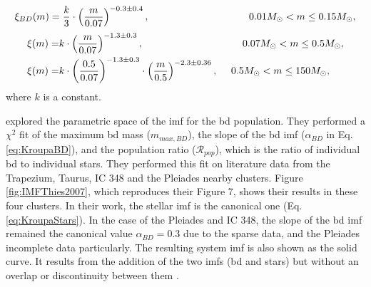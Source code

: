 \begin{equation}
\label{eq:KroupaBD}
\xi_{BD}(m)=\frac{k}{3}\cdot\left(\frac{m}{0.07}\right)^{-0.3\pm0.4}, \hspace{3.5cm} 0.01M_{\odot} < m \leq 0.15 M_{\odot},
\end{equation}
\begin{align}
\label{eq:KroupaStars}
\xi(m)=& k\cdot \left(\frac{m}{0.07}\right)^{-1.3\pm0.3}, \hspace{3.5cm} 0.07M_{\odot} < m \leq 0.5 M_{\odot},\nonumber\\
\xi(m)=& k\cdot \left(\frac{0.5}{0.07}\right)^{-1.3\pm0.3}\cdot  \left(\frac{m}{0.5}\right)^{-2.3\pm0.36}, \ \ \ \ 0.5 M_{\odot} < m \leq 150 M_{\odot},
\end{align}
where $k$ is a constant.
 
 \citet{Thies2007} explored the parametric space of the  \gls{imf} for the \gls{bd} population. They performed a $\chi^2$ fit of the maximum \gls{bd} mass ($m_{max,BD}$), the slope of the \gls{bd} \gls{imf} ($\alpha_{BD}$ in Eq. \ref{eq:KroupaBD}), and the population ratio ($\mathcal{R}_{pop}$), which is the ratio of individual \gls{bd} to individual stars. They performed this fit on literature data from the Trapezium, Taurus, IC 348 and the Pleiades nearby clusters. Figure \ref{fig:IMFThies2007}, which reproduces their Figure 7, shows their results in these four clusters. In their work, the stellar \gls{imf} is the canonical one (Eq. \ref{eq:KroupaStars}). In the case of the Pleiades and IC 348, the slope of the \gls{bd} \gls{imf} remained the canonical value $\alpha_{BD}=0.3$ due to the sparse data, and the Pleiades  incomplete data particularly. The resulting system \gls{imf} is also shown as the solid curve. It results from the addition of the two \glspl{imf} (\gls{bd} and stars) but without an overlap or discontinuity between them \cite[see][for details]{Thies2007}.
 
